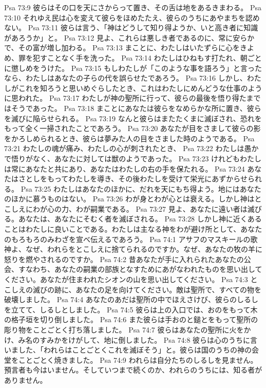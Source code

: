 Psa 73:9  彼らはその口を天にさからって置き、その舌は地をあるきまわる。
Psa 73:10  それゆえ民は心を変えて彼らをほめたたえ、彼らのうちにあやまちを認めない。
Psa 73:11  彼らは言う、「神はどうして知り得ようか、いと高き者に知識があろうか」と。
Psa 73:12  見よ、これらは悪しき者であるのに、常に安らかで、その富が増し加わる。
Psa 73:13  まことに、わたしはいたずらに心をきよめ、罪を犯すことなく手を洗った。
Psa 73:14  わたしはひねもす打たれ、朝ごとに懲しめをうけた。
Psa 73:15  もしわたしが「このような事を語ろう」と言ったなら、わたしはあなたの子らの代を誤らせたであろう。
Psa 73:16  しかし、わたしがこれを知ろうと思いめぐらしたとき、これはわたしにめんどうな仕事のように思われた。
Psa 73:17  わたしが神の聖所に行って、彼らの最後を悟り得たまではそうであった。
Psa 73:18  まことにあなたは彼らをなめらかな所に置き、彼らを滅びに陥らせられる。
Psa 73:19  なんと彼らはまたたくまに滅ぼされ、恐れをもって全く一掃されたことであろう。
Psa 73:20  あなたが目をさまして彼らの影をかろしめられるとき、彼らは夢みた人の目をさました時のようである。
Psa 73:21  わたしの魂が痛み、わたしの心が刺されたとき、
Psa 73:22  わたしは愚かで悟りがなく、あなたに対しては獣のようであった。
Psa 73:23  けれどもわたしは常にあなたと共にあり、あなたはわたしの右の手を保たれる。
Psa 73:24  あなたはさとしをもってわたしを導き、その後わたしを受けて栄光にあずからせられる。
Psa 73:25  わたしはあなたのほかに、だれを天にもち得よう。地にはあなたのほかに慕うものはない。
Psa 73:26  わが身とわが心とは衰える。しかし神はとこしえにわが心の力、わが嗣業である。
Psa 73:27  見よ、あなたに遠い者は滅びる。あなたは、あなたにそむく者を滅ぼされる。
Psa 73:28  しかし神に近くあることはわたしに良いことである。わたしは主なる神をわが避け所として、あなたのもろもろのみわざを宣べ伝えるであろう。
Psa 74:1  アサフのマスキールの歌 神よ、なぜ、われらをとこしえに捨てられるのですか。なぜ、あなたの牧の羊に怒りを燃やされるのですか。
Psa 74:2  昔あなたが手に入れられたあなたの公会、すなわち、あなたの嗣業の部族となすためにあがなわれたものを思い出してください。あなたが住まわれたシオンの山を思い出してください。
Psa 74:3  とこしえの滅びの跡に、あなたの足を向けてください。敵は聖所で、すべての物を破壊しました。
Psa 74:4  あなたのあだは聖所の中でほえさけび、彼らのしるしを立てて、しるしとしました。
Psa 74:5  彼らは上の入口では、おのをもって木の格子垣を切り倒しました。
Psa 74:6  また彼らは手おのと鎚とをもって聖所の彫り物をことごとく打ち落しました。
Psa 74:7  彼らはあなたの聖所に火をかけ、み名のすみかをけがして、地に倒しました。
Psa 74:8  彼らは心のうちに言いました、「われらはことごとくこれを滅ぼそう」と。彼らは国のうちの神の会堂をことごとく焼きました。
Psa 74:9  われらは自分たちのしるしを見ません。預言者も今はいません。そしていつまで続くのか、われらのうちには、知る者がありません。
